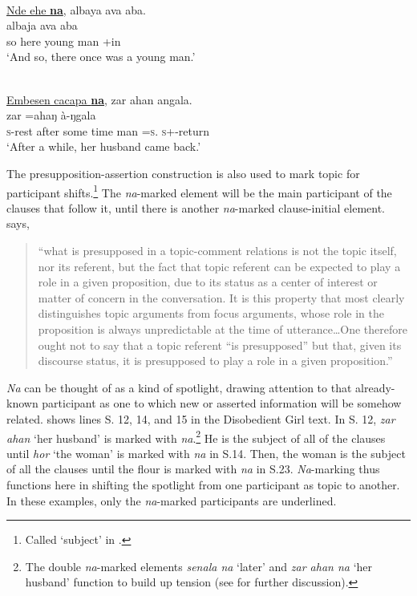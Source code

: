  
\ea \label{ex:11:34}
\\
\underline{Nde  ehe  \textbf{na}},  albaya  ava  aba. \\  
\gll  {}         albaja           ava    aba\\
      so     here   {\PSP}   {young man}  {\EXT}+in   {\EXT}  \\
\glt  ‘And so, there once was a young  man.’ 
\z

\ea \label{ex:11:35}
\\
\underline{Embesen  cacapa  \textbf{na}}, zar  ahan  angala.\\
\gll  {}        zar    =ahaŋ       à-ŋgala\\
      \textsc{s}-rest  {after some time}   {\PSP}   man  =\textsc{s}.{\POSS}  \textsc{s}+{\PFV}-return\\
\glt  ‘After a while, her husband came back.’ 
\z

The presupposition-assertion construction is also used to mark topic for participant shifts.\footnote{Called ‘subject’ in \citet{Chafe1976}.} The \textit{na}{}-marked element will be the main participant of the clauses that follow it, until there is another \textit{na}{}-marked clause-initial element. \citet[151]{Lambrecht1994} says,  

\begin{quote}
“what is presupposed in a topic-comment relations is not the topic itself, nor its referent, but the fact that topic referent can be expected to play a role in a given proposition, due to its status as a center of interest or matter of concern in the conversation. It is this property that most clearly distinguishes topic arguments from focus arguments, whose role in the proposition is always unpredictable at the time of utterance…One therefore ought not to say that a topic referent “is presupposed” but that, given its discourse status, it is presupposed to play a role in a given proposition.” 
\end{quote}

\textit{Na} can be thought of as a kind of spotlight, drawing attention to that already-known participant as one to which new or asserted information will be somehow related.  shows lines S. 12, 14, and 15 in the Disobedient Girl text. In S. 12, \textit{zar ahan} ‘her husband’ is marked with \textit{na}.\footnote{The double \textit{na}{}-marked elements \textit{senala na} ‘later’ and \textit{zar ahan na} ‘her husband’ function to build up tension (see  for further discussion).} He is the subject of all of the clauses until \textit{hor} ‘the woman’ is marked with \textit{na} in S.14. Then, the woman is the subject of all the clauses until the flour is marked with \textit{na} in S.23. \textit{Na}{}-marking thus functions here in shifting the spotlight from one participant as topic to another. In these examples, only the \textit{na}{}-marked participants are underlined. 

